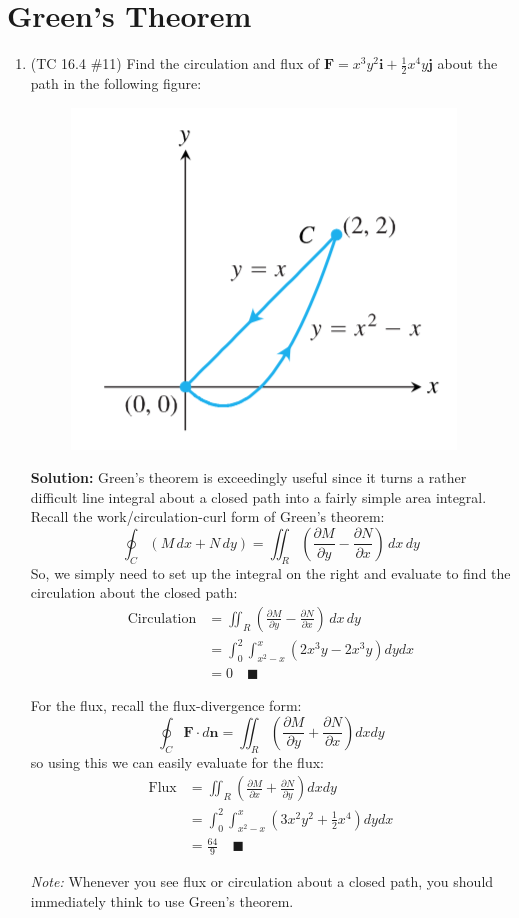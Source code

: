 \documentclass[letterpaper, 11pt]{article}
\begin{document}
\section{Green's Theorem}
\begin{enumerate}
\item (TC 16.4 \#11) Find the circulation and flux of $\bm{F} = x^3 y^2 \bm{i} + \frac{1}{2} x^4 y \bm{j}$ about the path in the following figure:
\begin{figure}[H]
\centering \includegraphics[width=0.2\columnwidth]{finalReviewImgs/TC164_11.png}
\end{figure}
\par \textbf{Solution:} Green's theorem is exceedingly useful since it turns a rather difficult line integral about a closed path into a fairly simple area integral. Recall the work/circulation-curl form of Green's theorem:
\[\oint_{C} (M\, dx + N\, dy) = \iint_{R} \left(\frac{\partial M}{\partial y} - \frac{\partial N}{\partial x}\right)\, dx\, dy \]
So, we simply need to set up the integral on the right and evaluate to find the circulation about the closed path:
\begin{align*}
\text{Circulation} &= \iint_{R} \left(\frac{\partial M}{\partial y} - \frac{\partial N}{\partial x}\right)\, dx\, dy \\
&=  \int_0^2 \int_{x^2 - x}^x \left( 2x^3y - 2 x^3y \right) dy dx \\
&= 0 \quad\blacksquare
\end{align*}

For the flux, recall the flux-divergence form:
\[ \oint_C \bm{F} \cdot d\bm{n} = \iint_R \left( \frac{\partial M}{\partial y} + \frac{\partial N}{\partial x} \right) dxdy \]
so using this we can easily evaluate for the flux: 
\begin{align*}
\text{Flux} &= \iint_R \left( \frac{\partial M}{\partial x} + \frac{\partial N}{\partial y} \right) dxdy \\
&=  \int_0^2 \int_{x^2 - x}^x \left( 3x^2y^2 + \frac{1}{2} x^4 \right) dydx \\
&= \frac{64}{9} \quad\blacksquare
\end{align*}

\par \textit{Note:} Whenever you see flux or circulation about a closed path, you should immediately think to use Green's theorem. 


\end{enumerate}
\end{document}
